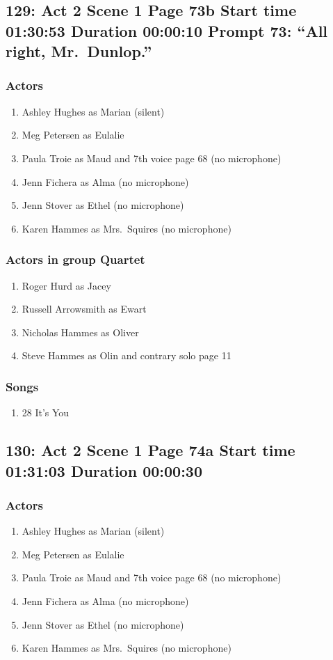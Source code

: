 \subsection{129: Act 2 Scene 1 Page 73b Start time 01:30:53 Duration 00:00:10 Prompt 73: ``All right, Mr.~Dunlop.''}

\subsubsection{Actors}
\begin{enumerate}
\item Ashley Hughes as Marian (silent)
\item Meg Petersen as Eulalie
\item Paula Troie as Maud and 7th voice page 68 (no microphone)
\item Jenn Fichera as Alma (no microphone)
\item Jenn Stover as Ethel (no microphone)
\item Karen Hammes as Mrs.~Squires (no microphone)
\end{enumerate}
\subsubsection{Actors in group Quartet}
\begin{enumerate}
\item Roger Hurd as Jacey
\item Russell Arrowsmith as Ewart
\item Nicholas Hammes as Oliver
\item Steve Hammes as Olin and contrary solo page 11
\end{enumerate}

\subsubsection{Songs}
\begin{enumerate}
\item 28 It's You
\end{enumerate}
\subsection{130: Act 2 Scene 1 Page 74a Start time 01:31:03 Duration 00:00:30}

\subsubsection{Actors}
\begin{enumerate}
\item Ashley Hughes as Marian (silent)
\item Meg Petersen as Eulalie
\item Paula Troie as Maud and 7th voice page 68 (no microphone)
\item Jenn Fichera as Alma (no microphone)
\item Jenn Stover as Ethel (no microphone)
\item Karen Hammes as Mrs.~Squires (no microphone)
\end{enumerate}
